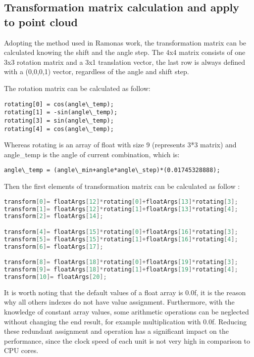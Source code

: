 \subsection{Transformation matrix calculation and apply to point cloud
}
Adopting the method used in Ramonas work, the transformation matrix can be calculated knowing the shift and the angle step. The 4x4  matrix consists of one 3x3 rotation matrix and a 3x1 translation vector, the last row is always defined with a (0,0,0,1) vector, regardless of the angle and shift step. 

The rotation matrix can be calculated as follow:

\begin{lstlisting}
rotating[0] = cos(angle\_temp);
rotating[1] = -sin(angle\_temp);
rotating[3] = sin(angle\_temp);
rotating[4] = cos(angle\_temp);
\end{lstlisting}

Whereas rotating is an array of float with size 9 (represents 3*3 matrix) and angle\_temp is the angle of current combination, which is:
\begin{lstlisting}
angle\_temp = (angle\_min+angle*angle\_step)*(0.01745328888);
\end{lstlisting}
Then the first elements of transformation matrix can be calculated as follow :
\begin{lstlisting}[language=C]
transform[0]= floatArgs[12]*rotating[0]+floatArgs[13]*rotating[3];
transform[1]= floatArgs[12]*rotating[1]+floatArgs[13]*rotating[4];
transform[2]= floatArgs[14];

transform[4]= floatArgs[15]*rotating[0]+floatArgs[16]*rotating[3];
transform[5]= floatArgs[15]*rotating[1]+floatArgs[16]*rotating[4];
transform[6]= floatArgs[17];

transform[8]= floatArgs[18]*rotating[0]+floatArgs[19]*rotating[3];
transform[9]= floatArgs[18]*rotating[1]+floatArgs[19]*rotating[4];
transform[10]= floatArgs[20];
\end{lstlisting}

It is worth noting that the default values of a float array is 0.0f, it is the reason why all others indexes do not have value assignment. Furthermore, with the knowledge of constant array values, some arithmetic operations can be neglected without changing the end result, for example multiplication with 0.0f. Reducing these redundant assignment and operation has a significant impact on the performance, since the clock speed of each unit is not very high in comparison to CPU cores. 

